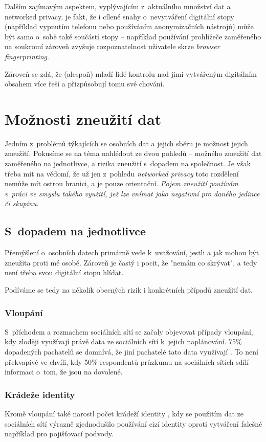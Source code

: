 Dalším zajímavým aspektem, vyplývajícím z~aktuálního množství dat a networked privacy, je fakt, že i cílené snahy o~nevytváření digitální stopy (například vypnutím telefonu nebo používáním anonymizačních nástrojů) může být samo o~sobě také součástí stopy -- například používání prohlížeče zaměřeného na soukromí zároveň zvyšuje rozpoznatelnost uživatele skrze \textit{browser fingerprinting}.

Zároveň se zdá, že (alespoň) mladí lidé kontrolu nad jimi vytvářeným digitálním obsahem více řeší a přizpůsobují tomu své chování\citep{youth-online-behavior}.

\section{Možnosti zneužití dat}
Jedním z~problémů týkajících se osobních dat a jejich sběru je možnost jejich zneužití. Pokusíme se na téma nahlédout ze dvou pohledů -- možného zneužití dat zaměřeného na jednotlivce, a rizika zneužití s~dopadem na společnost. Je však třeba mít na vědomí, že už jen z~pohledu \textit{networked privacy} toto rozdělení nemůže mít ostrou hranici, a je pouze orientační.
\textit{Pojem zneužití používám v~práci ve smyslu takého využití, jež lze vnímat jako negativní pro daného jedince či skupinu.}

\subsection{S~dopadem na jednotlivce}
Přemýšlení o~osobních datech primárně vede k~uvažování, jestli a jak mohou být zneužita proti mé osobě. Zároveň je častý i pocit, že "nemám co skrývat", a tedy není třeba svou digitální stopu hlídat.

Podíváme se tedy na několik obecných rizik i konkrétních případů zneužití dat.

\subsubsection*{Vloupání}
S~příchodem a rozmachem sociálních sítí se začaly objevovat případy vloupání, kdy zloději využívají právě data ze sociálních sítí k~jejich naplánování. 75\% dopadených pachatelů se domnívá, že jiní pachatelé tato data využívají \citep{burglary}.
To není překvapivé ve chvíli, kdy 50\% respondentů průzkumu na sociálních sítích sdílí informaci o~tom, že jsou na dovolené.\citep{burglary} 

\subsubsection*{Krádeže identity}
Kromě vloupání také narostl počet krádeží identity \citep{identity-theft-rise}, kdy se použitím dat ze sociálních sítí výrazně zjednodušilo používání cizí identity oproti vytváření falešné například pro pojišťovací podvody. 

